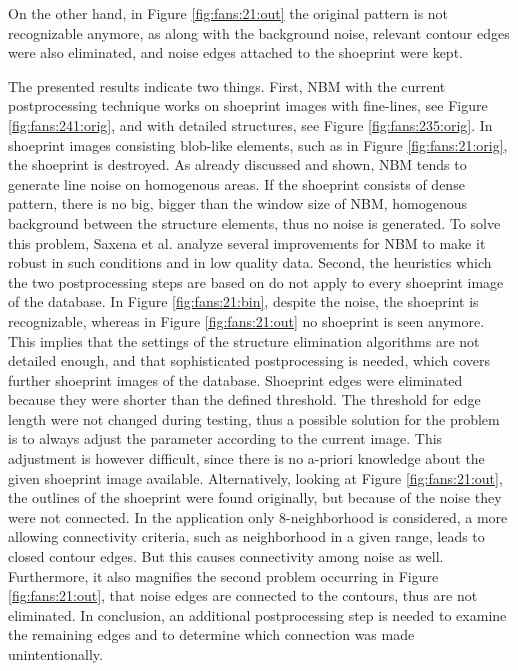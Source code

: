 \documentclass[draft,final]{vutinfth} %
\begin{document}
On the other hand, in Figure \ref{fig:fans:21:out} the original pattern is not recognizable anymore, as along with the background noise, relevant contour edges were also eliminated, and noise edges attached to the shoeprint were kept.
\par
The presented results indicate two things.
First, NBM with the current postprocessing technique works  on shoeprint images with fine-lines, see Figure \ref{fig:fans:241:orig}, and with detailed structures, see Figure \ref{fig:fans:235:orig}.
In shoeprint images consisting blob-like elements, such as in Figure \ref{fig:fans:21:orig}, the shoeprint is destroyed.
As already discussed and shown, NBM tends to generate line noise on homogenous areas.
If the shoeprint consists of dense pattern, there is no big, bigger than the window size of NBM, homogenous background between the structure elements, thus no noise is generated.
To solve this problem, Saxena et al. \cite{saxena2019niblack} analyze several improvements for NBM to make it robust in such conditions and in low quality data.
Second, the heuristics which the two postprocessing steps are based on do not apply to every shoeprint image of the database.
In Figure  \ref{fig:fans:21:bin}, despite the noise, the shoeprint is recognizable, whereas in Figure \ref{fig:fans:21:out} no shoeprint is seen anymore.
This implies that the settings of the structure elimination algorithms are not detailed enough, and that sophisticated postprocessing is needed, which covers further shoeprint images of the database.
Shoeprint edges were eliminated because they were shorter than the defined threshold.
The threshold for edge length were not changed during testing, thus a possible solution for the problem is to always adjust the parameter according to the current image.
This adjustment is however difficult, since there is no a-priori knowledge about the given shoeprint image available.
Alternatively, looking at Figure  \ref{fig:fans:21:out}, the outlines of the shoeprint were found originally, but because of the noise they were not connected.
In the application only 8-neighborhood is considered, a more allowing connectivity criteria, such as neighborhood in a given range, leads to closed contour edges.
But this causes connectivity among noise as well.
Furthermore, it also magnifies the second problem occurring in Figure \ref{fig:fans:21:out}, that noise edges are connected to the contours, thus are not eliminated.
In conclusion, an additional postprocessing step is needed to examine the remaining edges and to determine which connection was made unintentionally.
\end{document}
